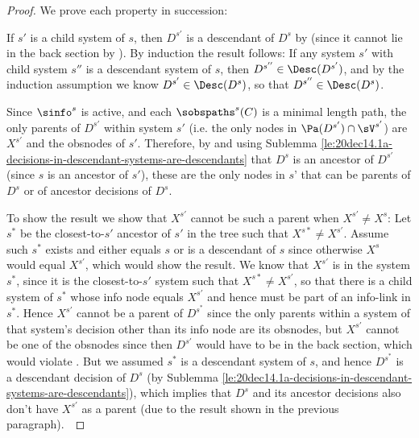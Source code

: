\begin{proof} We prove each property in succession:

If $s'$ is a child system of $s$, 
then $D^{s'}$ is a descendant of $D^s$ by 
(since it cannot lie in the back section by 
).
By induction the result follows: If any system $s'$ with child system $s''$ is a descendant system of $s$, then $D^{s''} \in \Desc(D^{s'})$, and by the induction assumption we know $D^{s'} \in \Desc(D^{s})$, so that $D^{s''} \in \Desc(D^{s})$.~


Since $\sinfo^s$ is active, and each $\sobspaths^s(C)$ is a minimal length path,
the only parents of $D^{s'}$ within system $s'$ (i.e. the only nodes in $\Pa(D^{s'})\cap \sV^{s'}$) are $X^{s'}$ and the obsnodes of $s'$. 
Therefore, by  and using Sublemma \ref{le:20dec14.1a-decisions-in-descendant-systems-are-descendants} that $D^s$ is an ancestor of $D^{s'}$ (since $s$ is an ancestor of $s'$), these are the only nodes in $s’$ that can be parents of $D^s$ or of ancestor decisions of $D^s$. 

To show the result we show that $X^{s'}$ cannot be such a parent when {$X^{s'} \neq X^s$}:
Let $s^*$ be the closest-to-$s'$ ancestor of $s'$ in the tree such that {$X^{s*}\neq X^{s'}$}. Assume such $s^*$ exists and either equals $s$ or is a descendant of $s$ since otherwise $X^{s}$ would equal $X^{s'}$, which would show the result.
We know that $X^{s'}$  is in the system $s^*$, since it is the closest-to-$s'$ system such that {$X^{s*}\neq X^{s'}$}, so that there is a child system of $s^*$ whose info node equals $X^{s'}$ {} and hence must be part of an info-link in $s^*$. 
Hence $X^{s'}$ cannot be a parent of $D^{s^*}$ since the only parents within a system of that system's decision other than its info node are its obsnodes, but $X^{s'}$  cannot be one of the obsnodes since then $D^{s'}$ would have to be in the back section, which would violate .
But we assumed $s^*$ is a descendant system of $s$, and hence $D^{s^*}$ is a descendant decision of $D^s$ (by Sublemma \ref{le:20dec14.1a-decisions-in-descendant-systems-are-descendants}), which implies that $D^s$ and its ancestor decisions also don't have $X^{s'}$ as a parent (due to the result shown in the previous paragraph).~
\end{proof}














